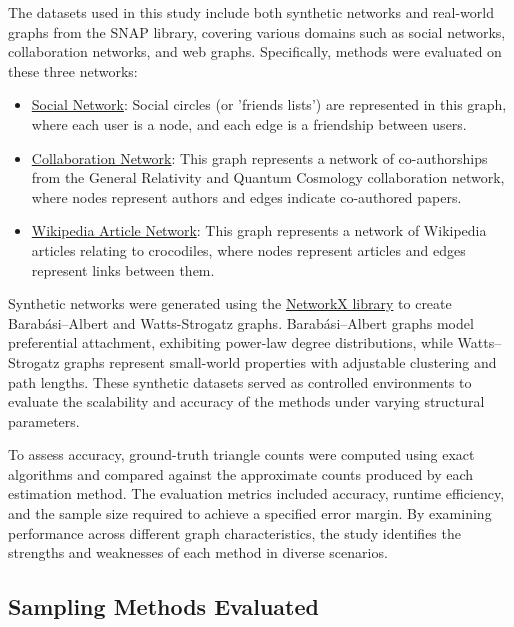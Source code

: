 \documentclass[11pt]{article}
\begin{document}
The datasets used in this study include both synthetic networks and real-world graphs from the SNAP library, covering various domains such as social networks, collaboration networks, and web graphs.
Specifically, methods were evaluated on these three networks:

\begin{itemize}
    \item \href{https://snap.stanford.edu/data/ego-Facebook.html}{Social Network}: Social circles (or 'friends lists') are represented in this graph, where each user is a node, and each edge is a friendship between users.
    \item \href{https://snap.stanford.edu/data/ca-GrQc.html}{Collaboration Network}: This graph represents a network of co-authorships from the General Relativity and Quantum Cosmology collaboration network, where nodes represent authors and edges indicate co-authored papers.
    \item \href{https://snap.stanford.edu/data/wikipedia-article-networks.html}{Wikipedia Article Network}: This graph represents a network of Wikipedia articles relating to crocodiles, where nodes represent articles and edges represent links between them.
\end{itemize}

Synthetic networks were generated using the \href{https://networkx.org/}{NetworkX library} to create Barabási–Albert \cite{albert_statistical_2002} and Watts-Strogatz \cite{watts_collective_1998} graphs.
Barabási–Albert graphs model preferential attachment, exhibiting power-law degree distributions, while Watts–Strogatz graphs represent small-world properties with adjustable clustering and path lengths.
These synthetic datasets served as controlled environments to evaluate the scalability and accuracy of the methods under varying structural parameters.

To assess accuracy, ground-truth triangle counts were computed using exact algorithms and compared against the approximate counts produced by each estimation method.
The evaluation metrics included accuracy, runtime efficiency, and the sample size required to achieve a specified error margin.
By examining performance across different graph characteristics, the study identifies the strengths and weaknesses of each method in diverse scenarios.

\subsection{Sampling Methods Evaluated}
\end{document}
